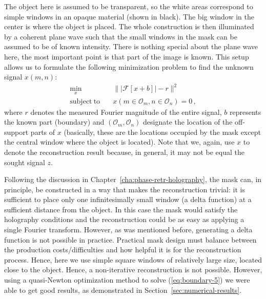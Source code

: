 The object here is
assumed to be transparent, so the white areas correspond to simple
windows in an opaque material (shown in black). The big window in the
center is where the object is placed. The whole
construction is then illuminated by a coherent plane wave such that
the small windows in the mask can be assumed to be of known intensity.
There is nothing special about the plane wave here, the
most important point is that part of the  image is
known. This setup allows us to formulate the following minimization
problem to find the unknown signal $x(m,n)$:
\begin{equation}
  \label{eq:boundary-5}
  \begin{split}
    \min_{x} &\quad \||\mathcal{F}[x + b]| - r\|^{2}\\
    \mathrm{subject\ to} &\quad x(m\in \mathcal{O}_{m}, n\in
    \mathcal{O}_{n})=0 \,, 
  \end{split}
\end{equation}
where $r$ denotes the measured Fourier magnitude of the entire signal,
$b$ represents the known part (boundary) and $(\mathcal{O}_{m},
\mathcal{O}_{n})$ designate the 
location of the off-support parts of $x$ (basically, these are the
locations occupied by the mask except the central window where the
object is located). Note that we, again, use $x$ to denote the
reconstruction result because, in general, it may not be equal the
sought signal $z$.

Following the discussion in Chapter~\ref{cha:phase-retr-holography},
the mask can, in principle, be constructed in a way that makes the reconstruction
trivial: it is sufficient to place only one infinitesimally small
window (a delta function) at a sufficient distance from the object. In
this case the mask would satisfy the holography conditions and the
reconstruction could be as easy as applying a single Fourier
transform.  However, as was mentioned before, generating a delta
function is not possible in practice. Practical mask design must
balance between the production costs/difficulties and how helpful it
is for the reconstruction process. Hence, here we use simple square
windows of relatively  large size, located close to the object. Hence,
a non-iterative reconstruction is not possible. However, using a
quasi-Newton optimization method to solve (\ref{eq:boundary-5}) we
were able to get good results, as demonstrated in
Section~\ref{sec:numerical-results}.

